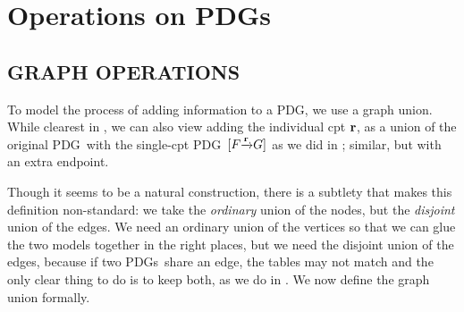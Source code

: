 \documentclass{article}
\newcommand{\MN}{PDG}
\newcommand{\MNs}{\MN s}
\numberwithin{equation}{section}
\begin{document}
	
	\section{Operations on PDGs}
	\subsection{GRAPH OPERATIONS}
	To model the process of adding information to a \MN, we use a graph union. While clearest in , we can also view adding the individual cpt $\mathbf r$, as a union of the original \MN\ with the single-cpt \MN\ $[F \smash{\xrightarrow{\mathbf r}} G]$ as we did in ;  similar, but with an extra endpoint.
	
	Though it seems to be a natural construction, there is a subtlety that makes this definition non-standard: we take the \emph{ordinary} union of the nodes, but the \emph{disjoint} union of the edges. We need an ordinary union of the vertices so that we can glue the two models together in the right places, but we need the disjoint union of the edges, because if two \MNs\ share an edge, the tables may not match and the only clear thing to do is to keep both, as we do in . 
	We now define the graph union formally. 
\end{document}
